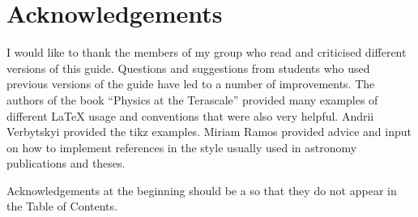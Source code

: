 \chapter*{Acknowledgements}
\label{sec:ack1}

I would like to thank the members of my group who read and criticised
different versions of this guide. Questions and suggestions from
students who used previous versions of the guide have led to a number
of improvements. The authors of the book \enquote{Physics at the
Terascale} provided many examples of different \LaTeX{} usage and
conventions that were also very helpful. Andrii Verbytskyi provided
the tikz examples.
Miriam Ramos provided advice and input on how to implement references 
in the style usually used in astronomy publications and theses.

Acknowledgements at the beginning should be a  so that they
do not appear in the Table of Contents.


